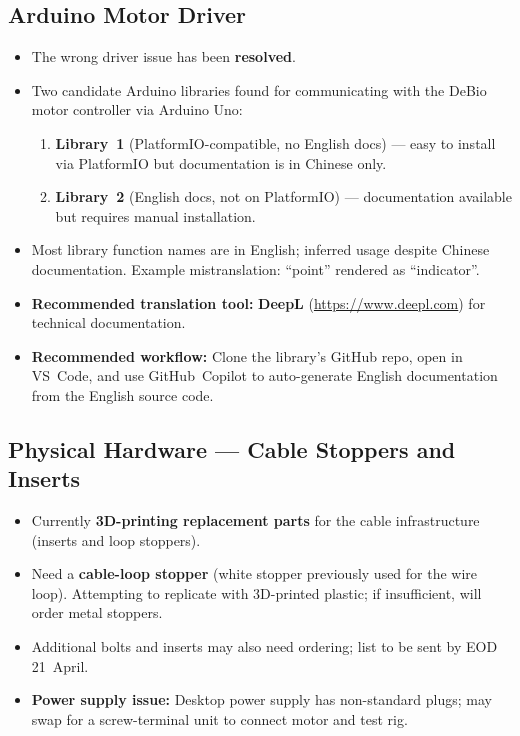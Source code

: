 \documentclass[11pt, a4paper]{article}
\begin{document}
\subsection{Arduino Motor Driver}

\begin{itemize}[nosep]
  \item The wrong driver issue has been \textbf{resolved}.
  \item Two candidate Arduino libraries found for communicating with the
    DeBio motor controller via Arduino Uno:
    \begin{enumerate}[nosep]
      \item \textbf{Library~1} (PlatformIO-compatible, no English docs) ---
        easy to install via PlatformIO but documentation is in Chinese only.
      \item \textbf{Library~2} (English docs, not on PlatformIO) ---
        documentation available but requires manual installation.
    \end{enumerate}
  \item Most library function names are in English; inferred usage despite
    Chinese documentation.  Example mistranslation: ``point'' rendered as
    ``indicator''.
  \item \textbf{Recommended translation tool:} \textbf{DeepL}
    (\url{https://www.deepl.com}) for technical documentation.
  \item \textbf{Recommended workflow:} Clone the library's GitHub repo,
    open in VS~Code, and use GitHub~Copilot to auto-generate English
    documentation from the English source code.
\end{itemize}

\subsection{Physical Hardware --- Cable Stoppers and Inserts}

\begin{itemize}[nosep]
  \item Currently \textbf{3D-printing replacement parts} for the cable
    infrastructure (inserts and loop stoppers).
  \item Need a \textbf{cable-loop stopper} (white stopper previously used for
    the wire loop).  Attempting to replicate with 3D-printed plastic;
    if insufficient, will order metal stoppers.
  \item Additional bolts and inserts may also need ordering; list to be sent
    by EOD 21~April.
  \item \textbf{Power supply issue:} Desktop power supply has non-standard
    plugs; may swap for a screw-terminal unit to connect motor and test rig.
\end{itemize}
\end{document}
